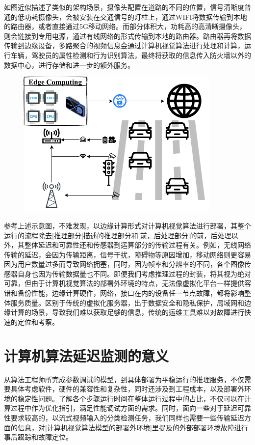 \documentclass[master]{shtthesis}
\begin{document}
如图近似描述了类似的架构场景，摄像头配置在道路的不同的位置，信号清晰度普通的低功耗摄像头，会被安装在交通信号的灯柱上，通过WIFI将数据传输到本地的路由器，或者直接通过5G移动网络。而部分体积大，功耗高的高清晰摄像头，则会链接到专用电源，通过有线网络的形式传输到本地的路由器。路由器再将数据传输到边缘设备，多路聚合的视频信息会通过计算机视觉算法进行处理和计算，运行车辆，驾驶员的属性检测和行为识别算法，最终将获取的信息传入防火墙以外的数据中心，进行存储和进一步的额外服务。

\begin{figure}[htbp]
	\centering
	\includegraphics[width=10cm]{img/trafic.pdf}
	\label{交通场景的边缘计算部署}
\end{figure}

参考上述示意图，不难发现，以边缘计算形式对计算机视觉算法进行部署，其整个运行的流程除去\ref{推理部分}描述的推理部分和\ref{前，后处理部分}的前，后处理以外，其整体延迟和可靠性还和传感器到运算部分的传输过程有关。例如，无线网络传输的延迟，会因为传输距离，信号干扰，障碍物等原因增加，移动网络则更容易因为用户数量过多而导致网络拥塞，同时，因为帧率和分辨率的不同，各个图像传感器自身也因为传输数据量也不同。即便我们考虑推理过程的封装，将其视为绝对可靠，但由于计算机视觉算法的部署外环境的特点，无法像虚拟化平台一样提供容错和备份性能，边缘计算硬件，网络，接口在内的设备任一节点故障，都将影响整体服务质量。区别于传统的虚拟化服务器，出于数据安全和隐私保护，局域网和边缘计算的场景，导致我们难以获取足够的信息，传统的运维工具难以对故障进行快速的定位和考察。

\section{计算机算法延迟监测的意义}\label{计算机算法延迟监测的意义}
从算法工程师所完成参数调试的模型，到具体部署为平稳运行的推理服务，不仅需要具体考虑软件，硬件的兼容性和复杂性，同时还涉及到工程成本，以及部署外环境的稳定性问题。了解各个步骤运行时间在整体运行过程中的占比，不仅可以在计算过程中作为优化指引，满足性能调试方面的需求。同时，面向一些对于延迟可靠性要求较高的，以流式视频输入的分类检测任务，我们同样也需要一些传输延迟方面的信息，对\ref{计算机视觉算法模型的部署外环境}里提及的外部部署环境故障进行事后跟踪和故障定位。
\end{document}
